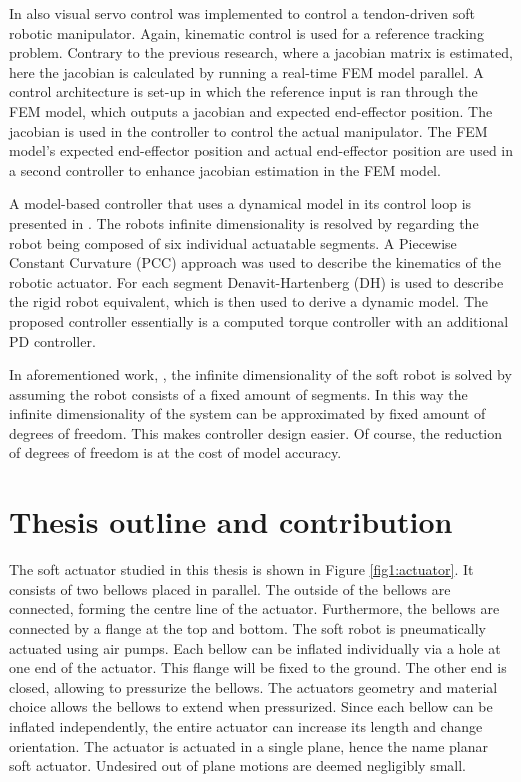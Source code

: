 In \cite{zhang2017visual} also visual servo control was implemented to control a tendon-driven soft robotic manipulator. Again, kinematic control is used for a reference tracking problem. Contrary to the previous research, where a jacobian matrix is estimated, here the jacobian is calculated by running a real-time FEM model parallel. A control architecture is set-up in which the reference input is ran through the FEM model, which outputs a jacobian and expected end-effector position. The jacobian is used in the controller to control the actual manipulator. The FEM model's expected end-effector position and actual end-effector position are used in a second controller to enhance jacobian estimation in the FEM model.

A model-based controller that uses a dynamical model in its control loop is presented in \cite{della2020model}. The robots infinite dimensionality is resolved by regarding the robot being composed of six individual actuatable segments. A Piecewise Constant Curvature (PCC) approach was used to describe the kinematics of the robotic actuator. For each segment Denavit-Hartenberg (DH) is used to describe the rigid robot equivalent, which is then used to derive a dynamic model. The proposed controller essentially is a computed torque controller with an additional PD controller. 

In aforementioned work, \cite{della2020model}, the infinite dimensionality of the soft robot is solved by assuming the robot consists of a fixed amount of segments. In this way the infinite dimensionality of the system can be approximated by fixed amount of degrees of freedom. This makes controller design easier. Of course, the reduction of degrees of freedom is at the cost of model accuracy. 




\section{Thesis outline and contribution}

The soft actuator studied in this thesis is shown in Figure \ref{fig1:actuator}. It consists of two bellows placed in parallel. The outside of the bellows are connected, forming the centre line of the actuator. Furthermore, the bellows are connected by a flange at the top and bottom. The soft robot is pneumatically actuated using air pumps. Each bellow can be inflated individually via a hole at one end of the actuator. This flange will be fixed to the ground. The other end is closed, allowing to pressurize the bellows. The actuators geometry and material choice allows the bellows to extend when pressurized. Since each bellow can be inflated independently, the entire actuator can increase its length and change orientation. The actuator is actuated in a single plane, hence the name planar soft actuator. Undesired out of plane motions are deemed negligibly small.



